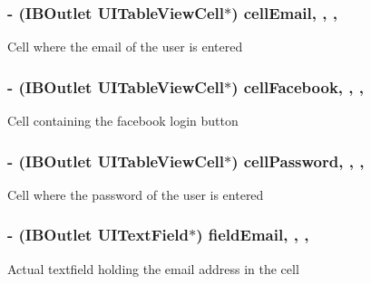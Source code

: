 \subsubsection[{cell\+Email}]{\setlength{\rightskip}{0pt plus 5cm}-\/ (I\+B\+Outlet U\+I\+Table\+View\+Cell$\ast$) cell\+Email\hspace{0.3cm}{\ttfamily [read]}, {\ttfamily [write]}, {\ttfamily [nonatomic]}, {\ttfamily [strong]}}\label{category_e_s_login_view_07_08_a5a0db15ba375bdb5653917b386e835e8}
Cell where the email of the user is entered \hypertarget{category_e_s_login_view_07_08_a75d84493e0bd02a6bf29ca3673bfd801}{}
\subsubsection[{cell\+Facebook}]{\setlength{\rightskip}{0pt plus 5cm}-\/ (I\+B\+Outlet U\+I\+Table\+View\+Cell$\ast$) cell\+Facebook\hspace{0.3cm}{\ttfamily [read]}, {\ttfamily [write]}, {\ttfamily [nonatomic]}, {\ttfamily [strong]}}\label{category_e_s_login_view_07_08_a75d84493e0bd02a6bf29ca3673bfd801}
Cell containing the facebook login button \hypertarget{category_e_s_login_view_07_08_a589ebcc18094c451ce7971c68f7a5b25}{}
\subsubsection[{cell\+Password}]{\setlength{\rightskip}{0pt plus 5cm}-\/ (I\+B\+Outlet U\+I\+Table\+View\+Cell$\ast$) cell\+Password\hspace{0.3cm}{\ttfamily [read]}, {\ttfamily [write]}, {\ttfamily [nonatomic]}, {\ttfamily [strong]}}\label{category_e_s_login_view_07_08_a589ebcc18094c451ce7971c68f7a5b25}
Cell where the password of the user is entered \hypertarget{category_e_s_login_view_07_08_a830205ad3358e6a584a213fe025bd14a}{}
\subsubsection[{field\+Email}]{\setlength{\rightskip}{0pt plus 5cm}-\/ (I\+B\+Outlet U\+I\+Text\+Field$\ast$) field\+Email\hspace{0.3cm}{\ttfamily [read]}, {\ttfamily [write]}, {\ttfamily [nonatomic]}, {\ttfamily [strong]}}\label{category_e_s_login_view_07_08_a830205ad3358e6a584a213fe025bd14a}
Actual textfield holding the email address in the cell \hypertarget{category_e_s_login_view_07_08_a9c06e566742c5efce7636e4a7e65f07f}{}
